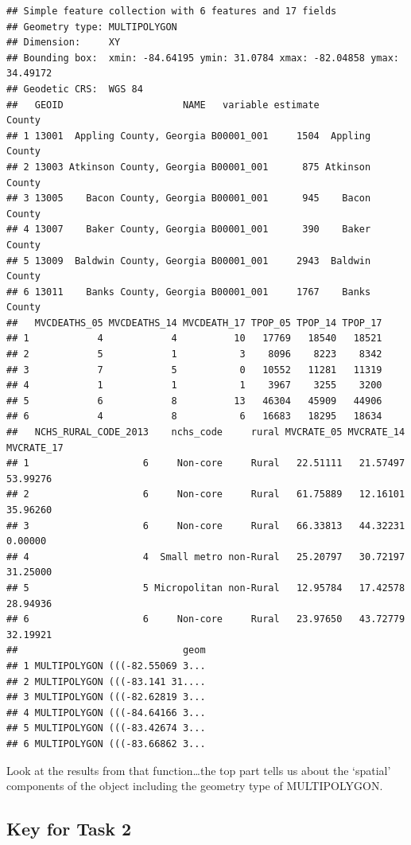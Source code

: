 \documentclass[
]{book}
\begin{document}
\begin{verbatim}
## Simple feature collection with 6 features and 17 fields
## Geometry type: MULTIPOLYGON
## Dimension:     XY
## Bounding box:  xmin: -84.64195 ymin: 31.0784 xmax: -82.04858 ymax: 34.49172
## Geodetic CRS:  WGS 84
##   GEOID                     NAME   variable estimate          County
## 1 13001  Appling County, Georgia B00001_001     1504  Appling County
## 2 13003 Atkinson County, Georgia B00001_001      875 Atkinson County
## 3 13005    Bacon County, Georgia B00001_001      945    Bacon County
## 4 13007    Baker County, Georgia B00001_001      390    Baker County
## 5 13009  Baldwin County, Georgia B00001_001     2943  Baldwin County
## 6 13011    Banks County, Georgia B00001_001     1767    Banks County
##   MVCDEATHS_05 MVCDEATHS_14 MVCDEATH_17 TPOP_05 TPOP_14 TPOP_17
## 1            4            4          10   17769   18540   18521
## 2            5            1           3    8096    8223    8342
## 3            7            5           0   10552   11281   11319
## 4            1            1           1    3967    3255    3200
## 5            6            8          13   46304   45909   44906
## 6            4            8           6   16683   18295   18634
##   NCHS_RURAL_CODE_2013    nchs_code     rural MVCRATE_05 MVCRATE_14 MVCRATE_17
## 1                    6     Non-core     Rural   22.51111   21.57497   53.99276
## 2                    6     Non-core     Rural   61.75889   12.16101   35.96260
## 3                    6     Non-core     Rural   66.33813   44.32231    0.00000
## 4                    4  Small metro non-Rural   25.20797   30.72197   31.25000
## 5                    5 Micropolitan non-Rural   12.95784   17.42578   28.94936
## 6                    6     Non-core     Rural   23.97650   43.72779   32.19921
##                             geom
## 1 MULTIPOLYGON (((-82.55069 3...
## 2 MULTIPOLYGON (((-83.141 31....
## 3 MULTIPOLYGON (((-82.62819 3...
## 4 MULTIPOLYGON (((-84.64166 3...
## 5 MULTIPOLYGON (((-83.42674 3...
## 6 MULTIPOLYGON (((-83.66862 3...
\end{verbatim}

Look at the results from that function\ldots the top part tells us about the `spatial' components of the object including the geometry type of MULTIPOLYGON.

\hypertarget{key-for-task-2}{%
\subsection{Key for Task 2}\label{key-for-task-2}}
\end{document}
